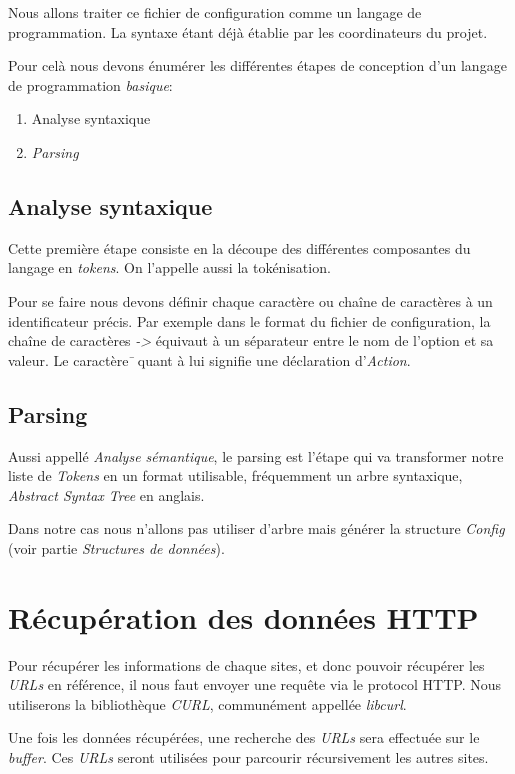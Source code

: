\documentclass[conference]{IEEEtran}
\begin{document}
Nous allons traiter ce fichier de configuration comme un langage de programmation.
La syntaxe étant déjà établie par les coordinateurs du projet.

Pour celà nous devons énumérer les différentes étapes de conception d'un langage de programmation \textit{basique}:
\begin{enumerate}
    \item Analyse syntaxique
    \item \textit{Parsing}
\end{enumerate}

\subsection{Analyse syntaxique}

Cette première étape consiste en la découpe des différentes composantes du langage en \textit{tokens}.
On l'appelle aussi la tokénisation.

Pour se faire nous devons définir chaque caractère ou chaîne de caractères à un identificateur précis.
Par exemple dans le format du fichier de configuration, la chaîne de caractères \textit{->} équivaut à un séparateur entre le nom de l'option et sa valeur.
Le caractère \textit{\=} quant à lui signifie une déclaration d'\textit{Action}.

\subsection{Parsing}

Aussi appellé \textit{Analyse sémantique}, le parsing est l'étape qui va transformer notre liste de \textit{Tokens} en un format utilisable, fréquemment un arbre syntaxique, \textit{Abstract Syntax Tree} en anglais.

Dans notre cas nous n'allons pas utiliser d'arbre mais générer la structure \textit{Config} (voir partie \textit{Structures de données}).


\section{Récupération des données HTTP}

Pour récupérer les informations de chaque sites, et donc pouvoir récupérer les \textit{URLs} en référence, il nous faut envoyer une requête via le protocol HTTP.
Nous utiliserons la bibliothèque \textit{CURL}, communément appellée \textit{libcurl}.

Une fois les données récupérées, une recherche des \textit{URLs} sera effectuée sur le \textit{buffer}.
Ces \textit{URLs} seront utilisées pour parcourir récursivement les autres sites.
\end{document}
